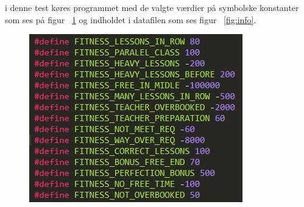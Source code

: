 i denne test køres programmet med de valgte værdier på symbolske konstanter som ses på figur ~\ref{fig:def} og indholdet i datafilen som ses figur ~\ref{fig:info}.

\begin{figure}[!h]
  \includegraphics[width=\textwidth]{partials/graphics/programtestdef.png}
  \caption{}
  \label{fig:def}
\end{figure}


